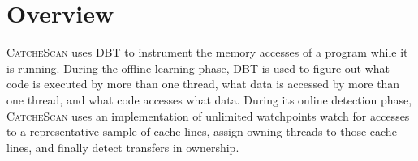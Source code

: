 \documentclass{sig-alternate}
\newcommand{\TextToolname}{CatcheScan}
\newcommand{\Toolname}{\textsc{\TextToolname{}}}
\begin{document}
\begin{itemize}

\end{itemize}



\section{Overview}\label{sec:overview}

\Toolname{} uses DBT to instrument the memory accesses of a program while it is running. During the offline
learning phase, DBT is used to figure out what code is executed by more than one thread, what data is accessed
by more than one thread, and what code accesses what data. During its online detection phase, \Toolname{} uses
an implementation of unlimited watchpoints watch for accesses to a representative sample of cache lines, assign
owning threads to those cache lines, and finally detect transfers in ownership.
\end{document}
